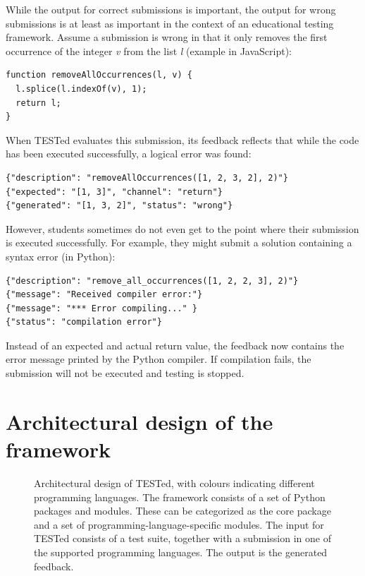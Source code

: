 \documentclass[../main]{subfiles}
\begin{document}
While the output for correct submissions is important, the output for wrong submissions is at least as important in the context of an educational testing framework.
Assume a submission is wrong in that it only removes the first occurrence of the integer \textit{v} from the list \textit{l} (example in JavaScript):

\begin{verbatim}
function removeAllOccurrences(l, v) {
  l.splice(l.indexOf(v), 1);
  return l;
}
\end{verbatim}

When TESTed evaluates this submission, its feedback reflects that while the code has been executed successfully, a logical error was found:

\begin{verbatim}
{"description": "removeAllOccurrences([1, 2, 3, 2], 2)"}
{"expected": "[1, 3]", "channel": "return"}
{"generated": "[1, 3, 2]", "status": "wrong"}
\end{verbatim}

However, students sometimes do not even get to the point where their submission is executed successfully.
For example, they might submit a solution containing a syntax error (in Python):

\begin{verbatim}
{"description": "remove_all_occurrences([1, 2, 2, 3], 2)"}
{"message": "Received compiler error:"}
{"message": "*** Error compiling..." }
{"status": "compilation error"}
\end{verbatim}

Instead of an expected and actual return value, the feedback now contains the error message printed by the Python compiler.
If compilation fails, the submission will not be executed and testing is stopped.

\section{Architectural design of the framework}\label{sec:tested1-architectural-design}

\begin{figure}
    \centering
    
    \caption{
        Architectural design of TESTed, with colours indicating different programming languages.
        The framework consists of a set of Python packages and modules.
        These can be categorized as the core package and a set of programming-language-specific modules.
        The input for TESTed consists of a test suite, together with a submission in one of the supported programming languages.
        The output is the generated feedback.
    }
    \label{fig:conceptual-design}
\end{figure}
\end{document}
